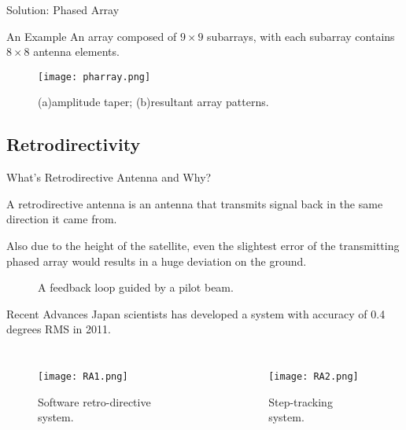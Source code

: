 \documentclass{beamer}
\begin{document}
\begin{frame}[label=pharray]{Solution: Phased Array}
  \begin{block}{An Example}
    An array composed of $9\times 9$ subarrays, with each subarray
    contains $8\times 8$ antenna elements.
  \end{block}
  \begin{figure}[H]
    \centering
    \texttt{[image: pharray.png]}
    \caption{\footnotesize (a)amplitude taper;
      (b)resultant array patterns.\cite{MPTHMSP}}
  \end{figure}
\end{frame}

\subsection{Retrodirectivity}
\begin{frame}[label=retroant]{What's Retrodirective Antenna and Why?}
  \begin{definition}
    A \alert{retrodirective antenna} is an antenna that transmits
    signal back in the same direction it came from.
  \end{definition}
  \pause
  Also due to the height of the satellite, even the slightest error
  of the transmitting phased array would results in a huge deviation
  on the ground.
  \pause
  \begin{figure}[H]
    \centering
    \caption{\footnotesize A feedback loop guided by
      a pilot beam.\cite{MPTtech4SPS}}
  \end{figure}
\end{frame}

\begin{frame}[label=retroRA]{Recent Advances}
  Japan scientists has developed a system with accuracy of
  \alert{0.4 degrees RMS} in 2011.\cite{PAandRA4MPT}
  \begin{columns}
    \begin{figure}[H]
      \centering
      {\texttt{[image: RA1.png]}}
      \caption{\footnotesize Software retro-directive
        system.\cite{PAandRA4MPT}}
    \end{figure}
    \begin{figure}[H]
      \centering
      {\texttt{[image: RA2.png]}}
      \caption{\footnotesize Step-tracking system.\cite{PAandRA4MPT}}
    \end{figure}
  \end{columns}
\end{frame}
\end{document}
